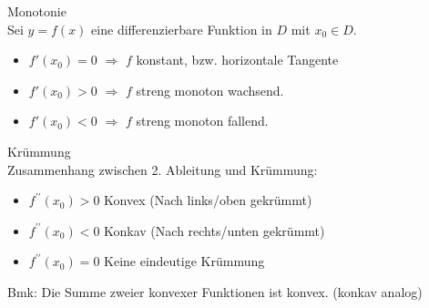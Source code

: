 \begin{definition}[breakable]{Monotonie}\\
    Sei $y=f(x)$ eine differenzierbare Funktion in $D$ mit $x_{0} \in D$.
    \begin{itemize}
        \item $f'( x_{0}) = 0$ $ \Rightarrow$   $f$ konstant, bzw. horizontale Tangente
        \item $f'( x_{0}) > 0 $ $ \Rightarrow$  $f$  streng monoton wachsend.
        \item $f'( x_{0}) < 0 $ $ \Rightarrow$ $f$ streng monoton fallend.
    \end{itemize}
\end{definition}
\begin{theorem}{Krümmung}\\
    Zusammenhang zwischen 2. Ableitung und Krümmung:
    \begin{itemize}
      \item $f^{\prime \prime}\left(x_{0}\right)>0$ Konvex (Nach links/oben gekrümmt)
      \item $f^{\prime \prime}\left(x_{0}\right)<0$ Konkav (Nach rechts/unten gekrümmt)
      \item $f^{\prime \prime}\left(x_{0}\right)=0$ Keine eindeutige Krümmung
    \end{itemize}
    Bmk: Die Summe zweier konvexer Funktionen ist konvex. (konkav analog)
\end{theorem}

